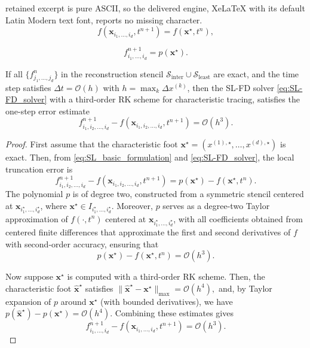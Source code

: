 \documentclass[10pt,a4paper]{amsart}
\begin{document}
retained excerpt is pure ASCII, so the delivered engine, XeLaTeX with its default Latin Modern text font, reports no missing character.
\begin{equation}
    f(\bm{x}_{i_1,\ldots,i_d},t^{n+1}) = f(\bm{x}^\star, t^n),
    \label{eq:SL_basic_formulation}
\end{equation}

\begin{equation}\label{eq:SL-FD_solver}
    f^{n+1}_{i_1,\ldots,i_d} = p(\bm{x}^\star).
\end{equation}

\begin{proposition}\label{prop:P2_analysis}
If all $\{f^n_{j_1,\ldots,j_d}\}$ in the reconstruction stencil $\mathcal{S}_{\mathrm{inter}} \cup \mathcal{S}_{\mathrm{least}}$ are exact, and the time step satisfies $\Delta t = \mathcal{O}(h)$ with $h = \max_k \Delta x^{(k)}$, then the SL-FD solver \eqref{eq:SL-FD_solver} with a third-order RK scheme for characteristic tracing, satisfies the one-step error estimate
\begin{equation*}
    f^{n+1}_{i_1,i_2,\ldots,i_d}-f(\bm{x}_{i_1,i_2,\ldots,i_d},t^{n+1})=\mathcal{O}(h^3).
\end{equation*}
\end{proposition}

\begin{proof}
    First assume that the characteristic foot $\bm{x}^\star = (x^{(1),\star},\ldots,x^{(d),\star})$ is exact. Then, from \eqref{eq:SL_basic_formulation} and \eqref{eq:SL-FD_solver}, the local truncation error is
    \begin{equation*}
        f^{n+1}_{i_1,i_2,\ldots,i_d} - f(\bm{x}_{i_1,i_2,\ldots,i_d},t^{n+1}) = p(\bm{x}^\star) - f(\bm{x}^\star,t^n).
    \end{equation*}
    The polynomial \( p \) is of degree two, constructed from a symmetric stencil centered at \( \bm{x}_{i_1^\star,\ldots,i_d^\star} \), where \( \bm{x}^\star \in I_{i_1^\star,\ldots,i_d^\star} \). Moreover, \( p \) serves as a degree-two Taylor approximation of \( f(\cdot, t^n) \) centered at \( \bm{x}_{i_1^\star,\ldots,i_d^\star} \), with all coefficients obtained from centered finite differences that approximate the first and second derivatives of \(f\) with second-order accuracy, ensuring that
    \begin{equation*}
        p(\bm{x}^\star) - f(\bm{x}^\star,t^n) = \mathcal{O}(h^3).
    \end{equation*}

    Now suppose \( \bm{x}^\star \) is computed with a third-order RK scheme. Then, the characteristic foot \( \hat{\bm{x}}^\star \) satisfies
    \(
        \|\hat{\bm{x}}^\star - \bm{x}^\star\|_{\max} = \mathcal{O}(h^4),
    \)
    and, by Taylor expansion of \( p \) around \( \bm{x}^\star \) (with bounded derivatives), we have
    \(
        p(\hat{\bm{x}}^\star) - p(\bm{x}^\star) = \mathcal{O}(h^4).
    \)
    Combining these estimates gives
    \[
        f^{n+1}_{i_1,\ldots,i_d} - f(\bm{x}_{i_1,\ldots,i_d}, t^{n+1}) 
        = \mathcal{O}(h^3).
    \]
\end{proof}
\end{document}
